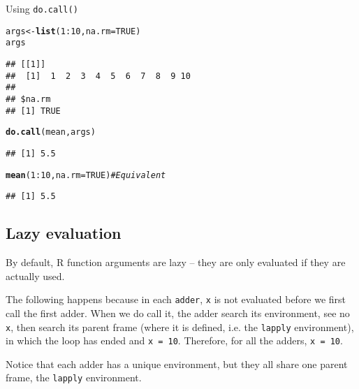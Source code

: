 \documentclass{article}\usepackage[]{graphicx}\usepackage[]{color}
\makeatletter
\newcommand{\hlnum}[1]{\textcolor[rgb]{0.686,0.059,0.569}{#1}}%
\newcommand{\hlcom}[1]{\textcolor[rgb]{0.678,0.584,0.686}{\textit{#1}}}%
\newcommand{\hlopt}[1]{\textcolor[rgb]{0,0,0}{#1}}%
\newcommand{\hlstd}[1]{\textcolor[rgb]{0.345,0.345,0.345}{#1}}%
\newcommand{\hlkwb}[1]{\textcolor[rgb]{0.69,0.353,0.396}{#1}}%
\newcommand{\hlkwc}[1]{\textcolor[rgb]{0.333,0.667,0.333}{#1}}%
\newcommand{\hlkwd}[1]{\textcolor[rgb]{0.737,0.353,0.396}{\textbf{#1}}}%
\newenvironment{kframe}{%
 \def\at@end@of@kframe{}%
 \ifinner\ifhmode%
  \def\at@end@of@kframe{\end{minipage}}%
  \begin{minipage}{\columnwidth}%
 \fi\fi%
 \def\FrameCommand##1{\hskip\@totalleftmargin \hskip-\fboxsep
 \colorbox{shadecolor}{##1}\hskip-\fboxsep
     \hskip-\linewidth \hskip-\@totalleftmargin \hskip\columnwidth}%
 \MakeFramed {\advance\hsize-\width
   \@totalleftmargin\z@ \linewidth\hsize
   \@setminipage}}%
 {\par\unskip\endMakeFramed%
 \at@end@of@kframe}
\newenvironment{knitrout}{}{} %
\makeatother
\begin{document}
Using \verb`do.call()`

\begin{knitrout}
\color{fgcolor}\begin{kframe}
\begin{alltt}
\hlstd{args} \hlkwb{<-} \hlkwd{list}\hlstd{(}\hlnum{1}\hlopt{:}\hlnum{10}\hlstd{,} \hlkwc{na.rm}\hlstd{=}\hlnum{TRUE}\hlstd{)}
\hlstd{args}
\end{alltt}
\begin{verbatim}
## [[1]]
##  [1]  1  2  3  4  5  6  7  8  9 10
## 
## $na.rm
## [1] TRUE
\end{verbatim}
\begin{alltt}
\hlkwd{do.call}\hlstd{(mean, args)}
\end{alltt}
\begin{verbatim}
## [1] 5.5
\end{verbatim}
\begin{alltt}
\hlkwd{mean}\hlstd{(}\hlnum{1}\hlopt{:}\hlnum{10}\hlstd{,} \hlkwc{na.rm}\hlstd{=}\hlnum{TRUE}\hlstd{)} \hlcom{# Equivalent}
\end{alltt}
\begin{verbatim}
## [1] 5.5
\end{verbatim}
\end{kframe}
\end{knitrout}

\subsection{Lazy evaluation}

By default, R function arguments are lazy -- they are only evaluated if they are actually used.

The following happens because in each \verb`adder`, \verb`x` is not evaluated before we first call the first adder. When we do call it, the adder search its environment, see no \verb`x`, then search its parent frame (where it is defined, i.e. the \verb`lapply` environment), in which the loop has ended and \verb`x = 10`. Therefore, for all the adders, \verb`x = 10`.

Notice that each adder has a unique environment, but they all share one parent frame, the \verb`lapply` environment.
\end{document}
